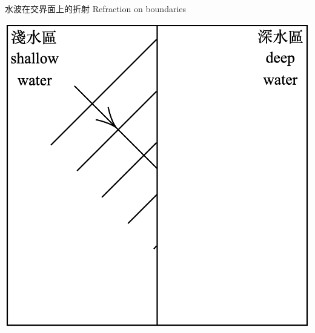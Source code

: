 \documentclass[beamer=true]{standalone}
\begin{document}
\begin{frame}{水波在交界面上的折射 Refraction on boundaries}


    \par{\par\centering\includegraphics[width=.6\textwidth]{./img/ch2_cf_2024-05-24-14-52-22.png}\par}
\end{frame}
\end{document}
